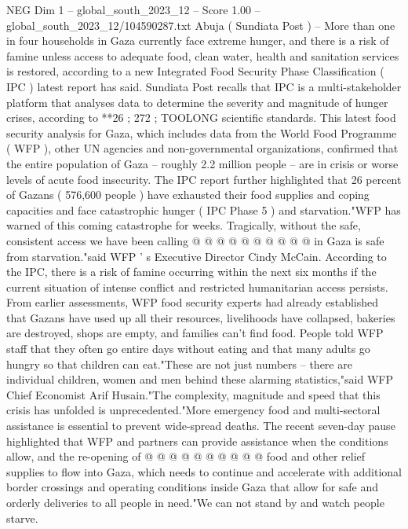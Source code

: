 \begin{textsample}{NEG Dim 1 – global\_south\_2023\_12 – Score 1.00 – global\_south\_2023\_12/104590287.txt}  \label{ex:f1_neg_296}
Abuja ( Sundiata Post ) -- More than one in four households in Gaza currently face extreme hunger, and there is a risk of famine unless access to adequate food, clean water, health and sanitation services is restored, according to a new Integrated Food Security Phase Classification ( IPC ) latest report has said.
Sundiata Post recalls that IPC is a multi-stakeholder platform that analyses data to determine the severity and magnitude of hunger crises, according to **26 ; 272 ; TOOLONG scientific standards.
This latest food security analysis for Gaza, which includes data from the World Food Programme ( WFP ), other UN agencies and non-governmental organizations, confirmed that the entire population of Gaza -- roughly 2.2 million people -- are in crisis or worse levels of acute food insecurity.
The IPC report further highlighted that 26 percent of Gazans ( 576,600 people ) have exhausted their food supplies and coping capacities and face catastrophic hunger ( IPC Phase 5 ) and starvation."WFP has warned of this coming catastrophe for weeks.
Tragically, without the safe, consistent access we have been calling @ @ @ @ @ @ @ @ @ @ in Gaza is safe from starvation."said WFP ' s Executive Director Cindy McCain.
According to the IPC, there is a risk of famine occurring within the next six months if the current situation of intense conflict and restricted humanitarian access persists.
From earlier assessments, WFP food security experts had already established that Gazans have used up all their resources, livelihoods have collapsed, bakeries are destroyed, shops are empty, and families can't find food.
People told WFP staff that they often go entire days without eating and that many adults go hungry so that children can eat."These are not just numbers -- there are individual children, women and men behind these alarming statistics,"said WFP Chief Economist Arif Husain."The complexity, magnitude and speed that this crisis has unfolded is unprecedented."More emergency food and multi-sectoral assistance is essential to prevent wide-spread deaths.
The recent seven-day pause highlighted that WFP and partners can provide assistance when the conditions allow, and the re-opening of @ @ @ @ @ @ @ @ @ @ food and other relief supplies to flow into Gaza, which needs to continue and accelerate with additional border crossings and operating conditions inside Gaza that allow for safe and orderly deliveries to all people in need."We can not stand by and watch people starve.

\end{textsample}
